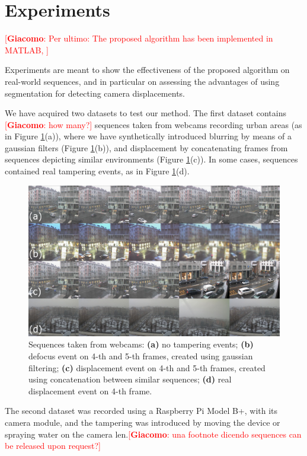 \documentclass{llncs}
\newcommand{\gi}[1]{{\textcolor{red}{[\small \textbf{Giacomo}: #1]}}}
\begin{document}

\section{Experiments}\label{sec:experiments}
\gi{Per ultimo: The proposed algorithm has been implemented in MATLAB, }

Experiments are meant to show the effectiveness of the proposed algorithm on real-world sequences, and in particular on assessing the advantages of using segmentation for detecting camera displacements.

We have acquired two datasets to test our method. The first dataset contains \gi{how many?} sequences taken from webcams recording urban areas (as in Figure \ref{fig:sequences}(a)), where we have synthetically introduced blurring by means of a gaussian filters (Figure \ref{fig:sequences}(b)), and displacement by concatenating frames from sequences depicting similar environments (Figure \ref{fig:sequences}(c)). In some cases, sequences contained real tampering events, as in Figure \ref{fig:sequences}(d).\\
\begin{figure}[t]
\centering
\includegraphics[width=1\linewidth]{Immagini/sequenze}
\caption{Sequences taken from webcams: \textbf{(a)} no tampering events; \textbf{(b)} defocus event on 4-th and 5-th frames, created using gaussian filtering; \textbf{(c)} displacement event on 4-th and 5-th frames, created using concatenation between similar sequences; \textbf{(d)} real displacement event on 4-th frame.}
\label{fig:sequences}
\end{figure}
The second dataset was recorded using a Raspberry Pi Model B+, with its camera module, and the tampering was introduced by moving the device or spraying water on the camera len.\gi{una footnote dicendo sequences can be released upon request?}
\end{document}

